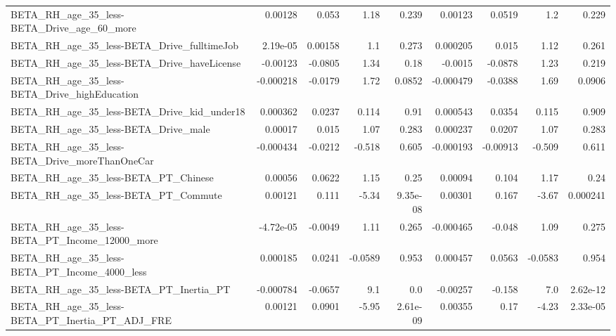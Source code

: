 \begin{tabular}{lrrrrrrrr}
BETA\_RH\_age\_35\_less-BETA\_Drive\_age\_60\_more         &     0.00128 &        0.053 &     1.18 &    0.239 &    0.00123 &      0.0519 &          1.2 &         0.229 \\
BETA\_RH\_age\_35\_less-BETA\_Drive\_fulltimeJob         &    2.19e-05 &      0.00158 &      1.1 &    0.273 &   0.000205 &       0.015 &         1.12 &         0.261 \\
BETA\_RH\_age\_35\_less-BETA\_Drive\_haveLicense         &    -0.00123 &      -0.0805 &     1.34 &     0.18 &    -0.0015 &     -0.0878 &         1.23 &         0.219 \\
BETA\_RH\_age\_35\_less-BETA\_Drive\_highEducation       &   -0.000218 &      -0.0179 &     1.72 &   0.0852 &  -0.000479 &     -0.0388 &         1.69 &        0.0906 \\
BETA\_RH\_age\_35\_less-BETA\_Drive\_kid\_under18         &    0.000362 &       0.0237 &    0.114 &     0.91 &   0.000543 &      0.0354 &        0.115 &         0.909 \\
BETA\_RH\_age\_35\_less-BETA\_Drive\_male                &     0.00017 &        0.015 &     1.07 &    0.283 &   0.000237 &      0.0207 &         1.07 &         0.283 \\
BETA\_RH\_age\_35\_less-BETA\_Drive\_moreThanOneCar      &   -0.000434 &      -0.0212 &   -0.518 &    0.605 &  -0.000193 &    -0.00913 &       -0.509 &         0.611 \\
BETA\_RH\_age\_35\_less-BETA\_PT\_Chinese                &     0.00056 &       0.0622 &     1.15 &     0.25 &    0.00094 &       0.104 &         1.17 &          0.24 \\
BETA\_RH\_age\_35\_less-BETA\_PT\_Commute                &     0.00121 &        0.111 &    -5.34 & 9.35e-08 &    0.00301 &       0.167 &        -3.67 &      0.000241 \\
BETA\_RH\_age\_35\_less-BETA\_PT\_Income\_12000\_more      &   -4.72e-05 &      -0.0049 &     1.11 &    0.265 &  -0.000465 &      -0.048 &         1.09 &         0.275 \\
BETA\_RH\_age\_35\_less-BETA\_PT\_Income\_4000\_less       &    0.000185 &       0.0241 &  -0.0589 &    0.953 &   0.000457 &      0.0563 &      -0.0583 &         0.954 \\
BETA\_RH\_age\_35\_less-BETA\_PT\_Inertia\_PT             &   -0.000784 &      -0.0657 &      9.1 &      0.0 &   -0.00257 &      -0.158 &          7.0 &      2.62e-12 \\
BETA\_RH\_age\_35\_less-BETA\_PT\_Inertia\_PT\_ADJ\_FRE     &     0.00121 &       0.0901 &    -5.95 & 2.61e-09 &    0.00355 &        0.17 &        -4.23 &      2.33e-05 \\

\end{tabular}
